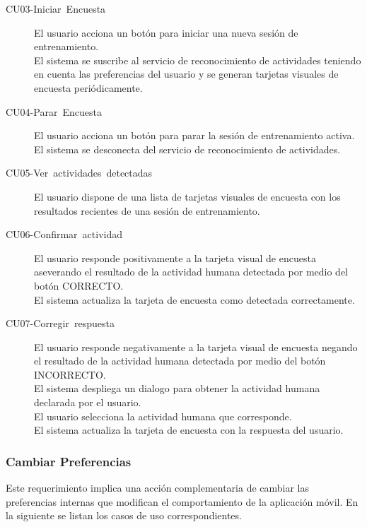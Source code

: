 \begin{description}
\item [{CU03-Iniciar~Encuesta}] El usuario acciona un botón para iniciar
una nueva sesión de entrenamiento. \\
El sistema se suscribe al servicio de reconocimiento de actividades
teniendo en cuenta las preferencias del usuario y se generan tarjetas
visuales de encuesta periódicamente.
\item [{CU04-Parar~Encuesta}] El usuario acciona un botón para parar la
sesión de entrenamiento activa. \\
El sistema se desconecta del servicio de reconocimiento de actividades.
\item [{CU05-Ver~actividades~detectadas}] El usuario dispone de una lista
de tarjetas visuales de encuesta con los resultados recientes de una
sesión de entrenamiento. 
\item [{CU06-Confirmar~actividad}] El usuario responde positivamente a
la tarjeta visual de encuesta aseverando el resultado de la actividad
humana detectada por medio del botón \flqq{}CORRECTO\frqq{}. \\
El sistema actualiza la tarjeta de encuesta como detectada correctamente.
\item [{CU07-Corregir~respuesta}] El usuario responde negativamente a
la tarjeta visual de encuesta negando el resultado de la actividad
humana detectada por medio del botón \flqq{}INCORRECTO\frqq{}. \\
El sistema despliega un dialogo para obtener la actividad humana declarada
por el usuario.\\
El usuario selecciona la actividad humana que corresponde. \\
El sistema actualiza la tarjeta de encuesta con la respuesta del usuario.
\end{description}

\subsubsection{Cambiar Preferencias}

Este requerimiento implica una acción complementaria de cambiar las
preferencias internas que modifican el comportamiento de la aplicación
móvil. En la siguiente  se listan los
casos de uso correspondientes.

